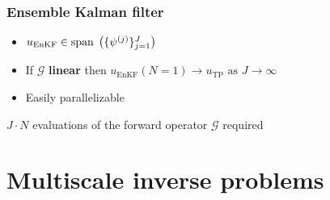 
\begin{frame}
\frametitle{Ensemble Kalman filter}
\begin{greenblock}[Properties]
\begin{itemize}
\item $u_{\mathrm{EnKF}} \in \mathrm{span}\; \left ( \{ \psi^{(j)} \}_{j=1}^J \right )$ 
\item If $\mathcal{G}$ \textbf{linear} then $u_{\mathrm{EnKF}}(N=1) \to u_{\mathrm{TP}} \text{ as } J \to \infty$
\item Easily parallelizable
\end{itemize}
\end{greenblock}
\vspace{1cm}
\begin{orangeblock}[Warning]
$J \cdot N$ evaluations of the forward operator $\mathcal{G}$ required
\end{orangeblock}
\end{frame}

\section{Multiscale inverse problems}


